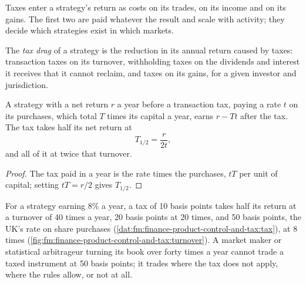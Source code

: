 Taxes enter a strategy's return as costs on its trades, on its income and on its gains. The first two are paid whatever the result and scale with
activity; they decide which strategies exist in which markets.

\begin{definition}\label{def:fm:finance-product-control-and-tax:drag}
The \emph{tax drag} of a strategy is the reduction in its annual return caused by taxes: transaction taxes on its turnover,
withholding taxes on the dividends and interest it receives that it cannot reclaim, and taxes on its gains, for a given investor and jurisdiction.
\end{definition}

\begin{proposition}\label{prop:fm:finance-product-control-and-tax:half}
A strategy with a net return $r$ a year before a transaction tax, paying a rate $t$ on its purchases, which total $T$ times its capital a year, earns
$r-Tt$ after the tax. The tax takes half its net return at
\[
T_{1/2}=\frac{r}{2t},
\]
and all of it at twice that turnover.
\end{proposition}

\begin{proof}
The tax paid in a year is the rate times the purchases, $tT$ per unit of capital; setting $tT=r/2$ gives $T_{1/2}$.
\end{proof}

For a strategy earning 8\% a year, a tax of 10 basis points takes half its return at a turnover of 40 times a year, 20 basis points at 20 times, and
50 basis points, the UK's rate on share purchases (\cref{dat:fm:finance-product-control-and-tax:tax}), at 8 times
(\cref{fig:fm:finance-product-control-and-tax:turnover}). A market maker or statistical arbitrageur turning its book over forty times a year cannot
trade a taxed instrument at 50 basis points; it trades where the tax does not apply, where the rules allow, or not at all.

